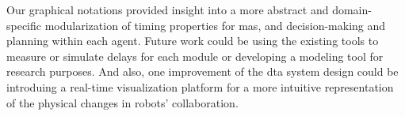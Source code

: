 Our graphical notations provided insight into a more abstract and domain-specific 
modularization of timing properties for \gls{mas}, and decision-making and planning 
within each agent. 
Future work could be using the existing tools to measure or simulate delays for 
each module or developing a modeling tool for research purposes. And also, one improvement 
of the \gls{dta} system design could be introduing a real-time visualization platform 
for a more intuitive representation of the physical changes in robots' collaboration.